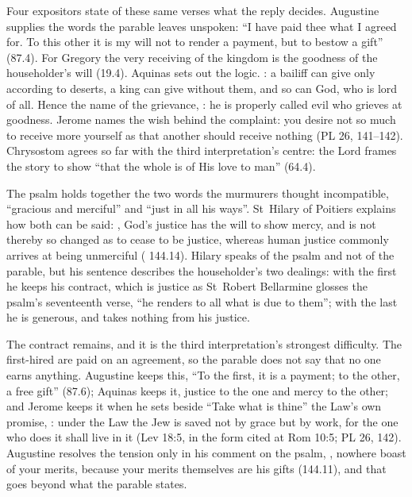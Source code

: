 Four expositors state of these same verses what the reply decides. Augustine
supplies the words the parable leaves unspoken: ``I have paid thee what I
agreed for. To this other it is my will not to render a payment, but to bestow
a gift'' (87.4). For Gregory the
very receiving of the kingdom is the goodness of the householder's will
(19.4). Aquinas sets out the logic. : a bailiff can give only according to
deserts, a king can give without them, and so can God, who is lord of all.
Hence the name of the grievance, : he is properly called evil who grieves at goodness. Jerome names the
wish behind the complaint: you desire not so much to receive more yourself as
that another should receive nothing (PL 26, 141--142). Chrysostom agrees so far with the third
interpretation's centre: the Lord frames the story to show ``that the whole is
of His love to man'' (64.4).

The psalm holds together the two words the murmurers thought incompatible,
``gracious and merciful'' and ``just in all his ways''. St~Hilary of Poitiers
explains how both can be said: , God's justice has the will to show mercy, and is not thereby so
changed as to cease to be justice, whereas human justice commonly arrives at
being unmerciful ( 144.14). Hilary speaks of the
psalm and not of the parable, but his sentence describes the householder's two
dealings: with the first he keeps his contract, which is justice as St~Robert
Bellarmine glosses the psalm's seventeenth verse, ``he renders to all what is due to
them''; with the last he is generous, and takes nothing from his justice.

The contract remains, and it is the third interpretation's strongest
difficulty. The first-hired are paid on an agreement, so the parable does not
say that no one earns anything. Augustine keeps this, ``To the first, it is a
payment; to the other, a free gift'' (87.6); Aquinas keeps it, justice to the one and mercy to the other; and
Jerome keeps it when he sets beside ``Take what is thine'' the Law's own
promise, : under the Law the Jew is saved not by grace but by
work, for the one who does it shall live in it (Lev 18:5, in the form cited at
Rom 10:5; PL 26, 142). Augustine resolves the tension only in his comment on
the psalm, , nowhere boast of your merits, because your merits themselves are
his gifts (144.11), and that goes beyond what the parable states.

